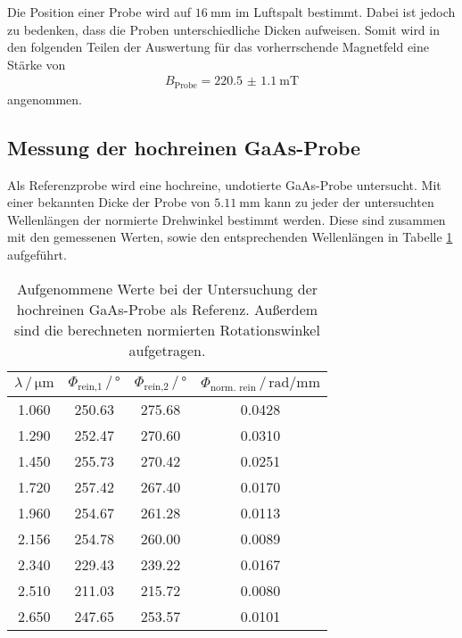  Die Position einer Probe wird auf $\SI{16}{\milli\meter}$ im Luftspalt bestimmt. Dabei ist jedoch zu bedenken,
 dass die Proben unterschiedliche Dicken aufweisen.
 Somit wird in den folgenden Teilen der Auswertung für das vorherrschende Magnetfeld eine Stärke von
 \begin{align*}
     B_\text{Probe} = \SI{220.5(11)}{\milli\tesla}
 \end{align*} \noindent
 angenommen.

 \subsection{Messung der hochreinen GaAs-Probe}
 Als Referenzprobe wird eine hochreine, undotierte GaAs-Probe untersucht.
 Mit einer bekannten Dicke der Probe von $\SI{5.11}{\milli\meter}$ kann zu jeder der untersuchten
 Wellenlängen der normierte Drehwinkel bestimmt werden. Diese sind zusammen mit den gemessenen Werten, sowie den
 entsprechenden Wellenlängen in Tabelle \ref{tab:hr_Messung} aufgeführt.
 \begin{table}[H]
    \centering
    \caption{Aufgenommene Werte bei der Untersuchung der hochreinen GaAs-Probe als Referenz. Außerdem sind die
    berechneten normierten Rotationswinkel aufgetragen.}
    \label{tab:hr_Messung}
    \begin{tabular}{cccc}
      \toprule
      $\lambda\, / \, \si{\micro\meter}$ & $\Phi_\text{rein,1} \, / \, \si{\degree}$ & $\Phi_\text{rein,2} \, / \, \si{\degree}$ & $\Phi_\text{norm. rein} \, / \, \si{\radian\per\milli\meter}$  \\
      \midrule
      \num{1.060} & \num{250.63} & \num{275.68} & \num{0.0428}  \\
      \num{1.290} & \num{252.47} & \num{270.60} & \num{0.0310}  \\
      \num{1.450} & \num{255.73} & \num{270.42} & \num{0.0251}  \\
      \num{1.720} & \num{257.42} & \num{267.40} & \num{0.0170}  \\
      \num{1.960} & \num{254.67} & \num{261.28} & \num{0.0113}  \\
      \num{2.156} & \num{254.78} & \num{260.00} & \num{0.0089}  \\
      \num{2.340} & \num{229.43} & \num{239.22} & \num{0.0167}  \\
      \num{2.510} & \num{211.03} & \num{215.72} & \num{0.0080}  \\
      \num{2.650} & \num{247.65} & \num{253.57} & \num{0.0101}  \\
      \bottomrule
    \end{tabular}
   \end{table} \noindent
